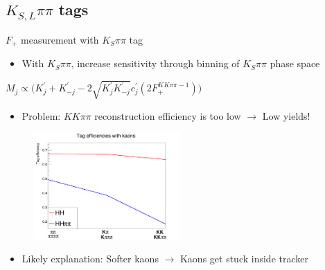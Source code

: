 \documentclass{beamer}
\begin{document}
\subsection{\texorpdfstring{$K_{S, L}\pi\pi$}{K0pipi} tags}

\begin{frame}{$F_+$ measurement with $K_S\pi\pi$ tag}
  \begin{itemize}
    \item{With $K_S\pi\pi$, increase sensitivity through binning of $K_S\pi\pi$ phase space}
  \end{itemize}
  \begin{center}
    $M_j\propto\big(K^\prime_j + K^\prime_{-j} - 2\sqrt{K^\prime_jK^\prime_{-j}}c^\prime_j(2F_+^{KK\pi\pi - 1})\big)$
  \end{center}
  \begin{itemize}
    \item{Problem: $KK\pi\pi$ reconstruction efficiency is too low $\to$ Low yields!}
  \end{itemize}
  \begin{figure}
    \includegraphics[width = 0.5\textwidth]{Plots/KaonTrackingEfficiency.png}
  \end{figure}
  \begin{itemize}
    \item{Likely explanation: Softer kaons $\to$ Kaons get stuck inside tracker}
  \end{itemize}
\end{frame}
\end{document}
